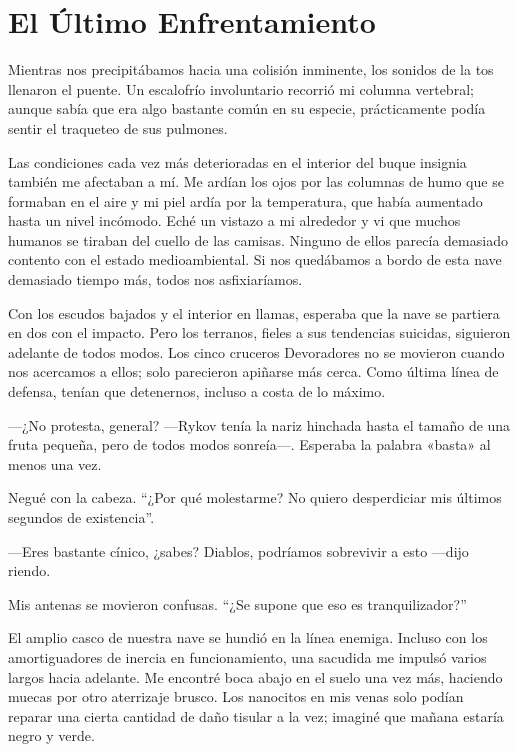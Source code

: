 \chapter{El Último Enfrentamiento}\label{sec:el-ultimo-enfrentamiento}

Mientras nos precipitábamos hacia una colisión inminente, los sonidos de la tos llenaron el puente. Un escalofrío involuntario recorrió mi columna vertebral; aunque sabía que era algo bastante común en su especie, prácticamente podía sentir el traqueteo de sus pulmones.

Las condiciones cada vez más deterioradas en el interior del buque insignia también me afectaban a mí. Me ardían los ojos por las columnas de humo que se formaban en el aire y mi piel ardía por la temperatura, que había aumentado hasta un nivel incómodo. Eché un vistazo a mi alrededor y vi que muchos humanos se tiraban del cuello de las camisas. Ninguno de ellos parecía demasiado contento con el estado medioambiental. Si nos quedábamos a bordo de esta nave demasiado tiempo más, todos nos asfixiaríamos.

Con los escudos bajados y el interior en llamas, esperaba que la nave se partiera en dos con el impacto. Pero los terranos, fieles a sus tendencias suicidas, siguieron adelante de todos modos. Los cinco cruceros Devoradores no se movieron cuando nos acercamos a ellos; solo parecieron apiñarse más cerca. Como última línea de defensa, tenían que detenernos, incluso a costa de lo máximo.

—¿No protesta, general? —Rykov tenía la nariz hinchada hasta el tamaño de una fruta pequeña, pero de todos modos sonreía—. Esperaba la palabra «basta» al menos una vez.

Negué con la cabeza. ``¿Por qué molestarme? No quiero desperdiciar mis últimos segundos de existencia''.

—Eres bastante cínico, ¿sabes? Diablos, podríamos sobrevivir a esto —dijo riendo.

Mis antenas se movieron confusas. ``¿Se supone que eso es tranquilizador?''

El amplio casco de nuestra nave se hundió en la línea enemiga. Incluso con los amortiguadores de inercia en funcionamiento, una sacudida me impulsó varios largos hacia adelante. Me encontré boca abajo en el suelo una vez más, haciendo muecas por otro aterrizaje brusco. Los nanocitos en mis venas solo podían reparar una cierta cantidad de daño tisular a la vez; imaginé que mañana estaría negro y verde.

